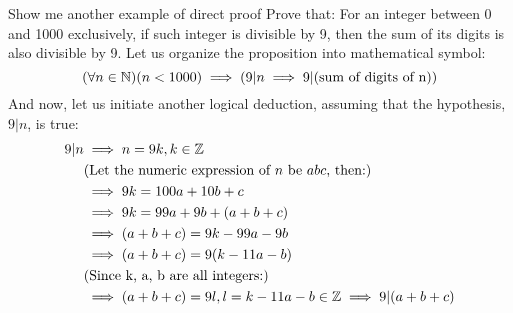 \begin{ln-think}{Show me another example of direct proof}{}
    Prove that: For an integer between 0 and 1000 exclusively, if such integer is divisible by 9, then the sum of its digits is also divisible by 9.
    \tcblower
    Let us organize the proposition into mathematical symbol:
    \[(\forall n \in \mathbb{N})(n < 1000) \implies (9|n \implies 9|(\text{sum of digits of n}))\]
    And now, let us initiate another logical deduction, assuming that the hypothesis, $9|n$, is true:
    \begin{align*}
        9|n &\implies n = 9k, k \in \mathbb{Z} \\
        &(\text{Let the numeric expression of $n$ be $abc$, then:}) \\
        &\implies 9k = 100a + 10b + c \\
        &\implies 9k = 99a + 9b + (a + b + c) \\
        &\implies (a + b + c) = 9k - 99a - 9b \\
        &\implies (a + b + c) = 9(k - 11a - b) \\
        &(\text{Since k, a, b are all integers:}) \\
        &\implies (a + b + c) = 9l, l = k - 11a - b \in \mathbb{Z} \implies 9|(a + b + c)
    \end{align*}
\end{ln-think}

